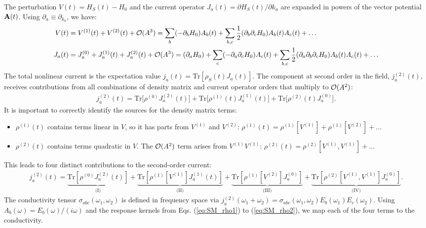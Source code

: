 \documentclass[twocolumn, prx, reprint, amsfonts, amsmath, amssymb, longbibliography, floatfix, aps]{revtex4-2}
\begin{document}
The perturbation $V(t) = H_S(t) - H_0$ and the current operator $J_a(t) = \partial H_S(t) / \partial k_a$ are expanded in powers of the vector potential ${\bf A}(t)$. Using $\partial_a \equiv \partial_{k_a}$, we have:
\begin{align}
V(t) &= V^{(1)}(t) + V^{(2)}(t) + {\cal O}(A^3)
= \sum_b (-\partial_b H_0) A_b(t) + \sum_{b,c} \frac{1}{2} (\partial_b \partial_c H_0) A_b(t) A_c(t) + \dots
\\
J_a(t) &= J_a^{(0)} + J_a^{(1)}(t) + J_a^{(2)}(t) + {\cal O}(A^3)
= (\partial_a H_0) + \sum_c (-\partial_a \partial_c H_0) A_c(t) + \sum_{b,c} \frac{1}{2} (\partial_a \partial_b \partial_c H_0) A_b(t) A_c(t) + \dots
\end{align}
The total nonlinear current is the expectation value $j_a(t) = \text{Tr}[\rho_S(t) J_a(t)]$. The component at second order in the field, $j_a^{(2)}(t)$, receives contributions from all combinations of density matrix and current operator orders that multiply to ${\cal O}(A^2)$:
\begin{align}
j_a^{(2)}(t) = \text{Tr}\big[ \rho^{(0)} J_a^{(2)}(t) \big] + \text{Tr}\big[ \rho^{(1)}(t) J_a^{(1)}(t) \big] + \text{Tr}\big[ \rho^{(2)}(t) J_a^{(0)} \big].
\end{align}
It is important to correctly identify the sources for the density matrix terms:
\begin{itemize}
    \item $\rho^{(1)}(t)$ contains terms linear in $V$, so it has parts from $V^{(1)}$ and $V^{(2)}$: $\rho^{(1)}(t) = \rho^{(1)}[V^{(1)}] + \rho^{(1)}[V^{(2)}] + \dots$
    \item $\rho^{(2)}(t)$ contains terms quadratic in $V$. The ${\cal O}(A^2)$ term arises from $V^{(1)}V^{(1)}$: $\rho^{(2)}(t) = \rho^{(2)}[V^{(1)}, V^{(1)}] + \dots$
\end{itemize}
This leads to four distinct contributions to the second-order current:
\begin{align}
j_a^{(2)}(t) = \underbrace{\text{Tr}[\rho^{(0)} J_a^{(2)}(t)]}_{\text{(I)}}
+ \underbrace{\text{Tr}[\rho^{(1)}[V^{(1)}] J_a^{(1)}(t)]}_{\text{(II)}}
+ \underbrace{\text{Tr}[\rho^{(1)}[V^{(2)}] J_a^{(0)}]}_{\text{(III)}}
+ \underbrace{\text{Tr}[\rho^{(2)}[V^{(1)}, V^{(1)}] J_a^{(0)}]}_{\text{(IV)}}.
\end{align}
The conductivity tensor $\sigma_{abc}(\omega_1, \omega_2)$ is defined in frequency space via $j_a^{(2)}(\omega_1 + \omega_2) = \sigma_{abc}(\omega_1, \omega_2) E_b(\omega_1) E_c(\omega_2)$. Using $A_b(\omega) = E_b(\omega) / (i\omega)$ and the response kernels from Eqs. (\ref{eq:SM_rho1}) to (\ref{eq:SM_rho2}), we map each of the four terms to the conductivity.
\end{document}
